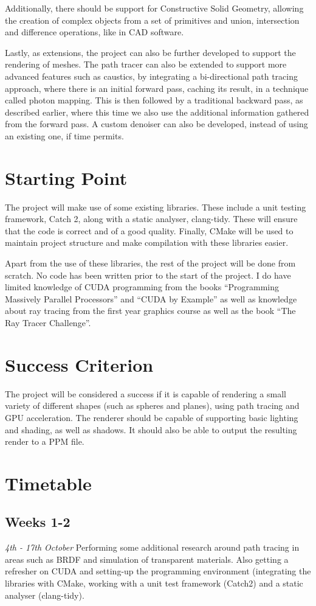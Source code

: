 \documentclass[12pt, a4paper]{article}
\newcommand{\newtime}[3]{
    \subsection*{#1}
    \vspace{-\baselineskip}
    \emph{#2}
    \vspace{\baselineskip}
    \newline
    #3
}
\begin{document}
    Additionally, there should be support for Constructive Solid Geometry, allowing the creation of complex objects from a set of primitives and union, intersection and difference operations, like in CAD software.

    Lastly, as extensions, the project can also be further developed to support the rendering of meshes. The path tracer can also be extended to support more advanced features such as caustics, by integrating a bi-directional path tracing approach, where there is an initial forward pass, caching its result, in a technique called photon mapping. This is then followed by a traditional backward pass, as described earlier, where this time we also use the additional information gathered from the forward pass. A custom denoiser can also be developed, instead of using an existing one, if time permits.

    \section*{Starting Point}
    The project will make use of some existing libraries. These include a unit testing framework, Catch 2, along with a static analyser, clang-tidy. These will ensure that the code is correct and of a good quality. Finally, CMake will be used to maintain project structure and make compilation with these libraries easier.

    Apart from the use of these libraries, the rest of the project will be done from scratch. No code has been written prior to the start of the project. I do have limited knowledge of CUDA programming from the books “Programming Massively Parallel Processors” and “CUDA by Example” as well as knowledge about ray tracing from the first year graphics course as well as the book “The Ray Tracer Challenge”.

    \section*{Success Criterion}
    The project will be considered a success if it is capable of rendering a small variety of different shapes (such as spheres and planes), using path tracing and GPU acceleration. The renderer should be capable of supporting basic lighting and shading, as well as shadows. It should also be able to output the resulting render to a PPM file.

    \section*{Timetable}
    \newtime{Weeks 1-2}{4th - 17th October}{Performing some additional research around path tracing in areas such as BRDF and simulation of transparent materials. Also getting a refresher on CUDA and setting-up the programming environment (integrating the libraries with CMake, working with a unit test framework (Catch2) and a static analyser (clang-tidy).}
\end{document}

